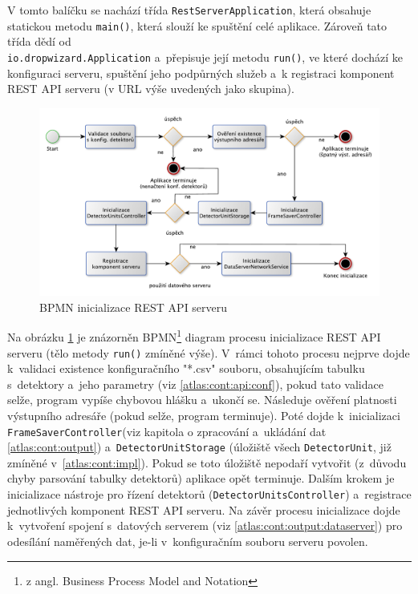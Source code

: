 V tomto balíčku se nachází třída \texttt{RestServerApplication}, která obsahuje statickou metodu \texttt{main()}, která slouží ke spuštění celé aplikace. Zároveň tato třída dědí od \\\texttt{io.dropwizard.Application} a~přepisuje její metodu \texttt{run()}, ve které dochází ke konfiguraci serveru, spuštění jeho podpůrných služeb a~k registraci komponent REST API serveru (v URL výše uvedených jako skupina).

\begin{figure}[th]
	\begin{center}
		\includegraphics[width=15cm]{figures/atlas_tpx_api_server_init.pdf}
		\caption{BPMN inicializace REST API serveru}
		\label{fig:atlas:apiserver-init}
	\end{center}
\end{figure}

Na obrázku \ref{fig:atlas:apiserver-init} je znázorněn BPMN\footnote{z angl. Business Process Model and Notation} diagram procesu inicializace REST API serveru (tělo metody \texttt{run()} zmíněné výše). V~rámci tohoto procesu nejprve dojde k~validaci existence konfiguračního "*.csv" souboru, obsahujícím tabulku s~detektory a~jeho parametry (viz \ref{atlas:cont:api:conf}), pokud tato validace selže, program vypíše chybovou hlášku a~ukončí se.  Následuje ověření platnosti výstupního adresáře (pokud selže, program terminuje). Poté dojde k~inicializaci \texttt{FrameSaverController}(viz kapitola o zpracování a~ukládání dat \ref{atlas:cont:output}) a~\texttt{DetectorUnitStorage} (úložiště všech \texttt{DetectorUnit}, již zmíněné v~\ref{atlas:cont:impl}). Pokud se toto úložiště nepodaří vytvořit (z~důvodu chyby parsování tabulky detektorů) aplikace opět terminuje. Dalším krokem je inicializace nástroje pro řízení detektorů (\texttt{DetectorUnitsController}) a~registrace jednotlivých komponent REST API serveru. Na závěr procesu inicializace dojde k~vytvoření spojení s~datových serverem (viz \ref{atlas:cont:output:dataserver}) pro odesílání naměřených dat, je-li v~konfiguračním souboru serveru povolen. 

